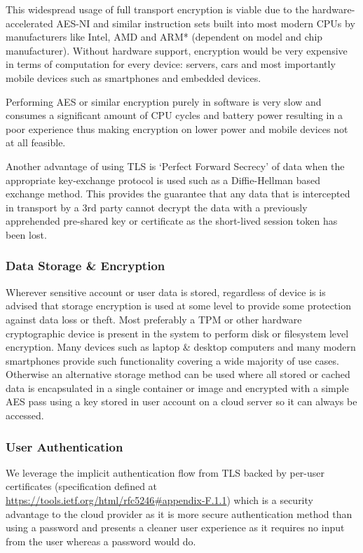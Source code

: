 \documentclass{article}
\begin{document}
This widespread usage of full transport encryption is viable due to the hardware-accelerated AES-NI and similar instruction sets built into most modern CPUs by manufacturers like Intel, AMD and ARM* (dependent on model and chip manufacturer). Without hardware support, encryption would be very expensive in terms of computation for every device: servers, cars and most importantly mobile devices such as smartphones and embedded devices.

Performing AES or similar encryption purely in software is very slow and consumes a significant amount of CPU cycles and battery power resulting in a poor experience thus making encryption on lower power and mobile devices not at all feasible.

Another advantage of using TLS is `Perfect Forward Secrecy' of data when the appropriate key-exchange protocol is used such as a Diffie-Hellman based exchange method. This provides the guarantee that any data that is intercepted in transport by a 3rd party cannot decrypt the data with a previously apprehended pre-shared key or certificate as the short-lived session token has been lost.

\subsubsection{Data Storage \& Encryption}
Wherever sensitive account or user data is stored, regardless of device is is advised that storage encryption is used at some level to provide some protection against data loss or theft. Most preferably a TPM or other hardware cryptographic device is present in the system to perform disk or filesystem level encryption. Many devices such as laptop \& desktop computers and many modern smartphones provide such functionality covering a wide majority of use cases. Otherwise an alternative storage method can be used where all stored or cached data is encapsulated in a single container or image and encrypted with a simple AES pass using a key stored in user account on a cloud server so it can always be accessed.

\subsubsection{User Authentication}
We leverage the implicit authentication flow from TLS backed by per-user certificates (specification defined at \url{https://tools.ietf.org/html/rfc5246#appendix-F.1.1}) which is a security advantage to the cloud provider  as it is more secure authentication method than using a password and presents a cleaner user experience as it requires no input from the user whereas a password would do.
\end{document}
